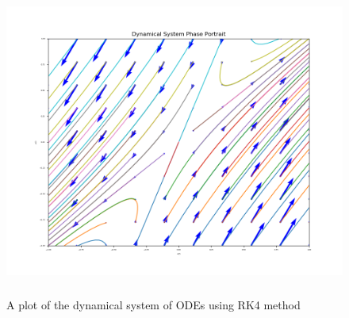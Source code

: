 \documentclass[12pt,a4paper]{article}
\begin{document}
\begin{enumerate}
\begin{figure}[!h]
									\includegraphics[width=500pt,  height=290pt]{./graphics/q001_d.png}
										\caption{A plot of the dynamical system of ODEs using RK4 method}
										\label{fig:q4}
								\end{figure}
\end{enumerate}
\end{document}
